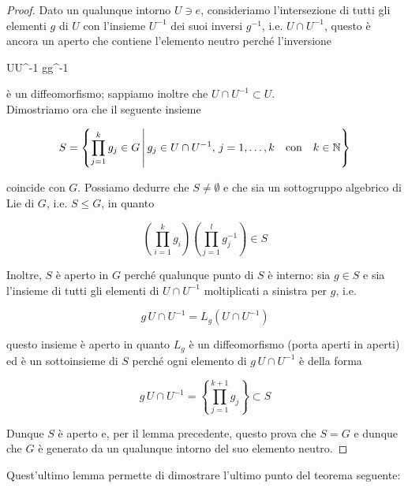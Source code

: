 \begin{proof}
	Dato un qualunque intorno $ U \ni e $, consideriamo l'intersezione di tutti gli elementi $ g $ di $ U $ con l'insieme $ U^{-1} $ dei suoi inversi $ g^{-1} $, i.e. $ U \cap U^{-1} $,  questo è ancora un aperto che contiene l'elemento neutro perché l'inversione
	
		{U}{U^{-1}}
		{g}{g^{-1}}
	
	è un diffeomorfismo; sappiamo inoltre che $ U \cap U^{-1} \subset U $.\\
	Dimostriamo ora che il seguente insieme
	
	\begin{equation}
		S = \left\{ \prod_{j=1}^{k} g_{j} \in G \st g_{j} \in U \cap U^{-1}, \, j=1,\dots,k \qq{con} k \in \N \right\}
	\end{equation}
	
	coincide con $ G $. Possiamo dedurre che $ S \neq \emptyset $ e che sia un sottogruppo algebrico di Lie di $ G $, i.e. $ S \leqslant G $, in quanto
	
	\begin{equation}
		\left( \prod_{i=1}^{k} g_{i} \right) \left( \prod_{j=1}^{l} g_{j}^{-1} \right) \in S
	\end{equation}
	
	Inoltre, $ S $ è aperto in $ G $ perché qualunque punto di $ S $ è interno: sia $ g \in S $ e sia l'insieme di tutti gli elementi di $ U \cap U^{-1} $ moltiplicati a sinistra per $ g $, i.e.
	
	\begin{equation}
		g \, U \cap U^{-1} = L_{g}(U \cap U^{-1})
	\end{equation}
	
	questo insieme è aperto in quanto $ L_{g} $ è un diffeomorfismo (porta aperti in aperti) ed è un sottoinsieme di $ S $ perché ogni elemento di $ g \, U \cap U^{-1} $ è della forma
	
	\begin{equation}
		g \, U \cap U^{-1} = \left\{ \prod_{j=1}^{k+1} g_{j} \right\} \subset S
	\end{equation}
	
	Dunque $ S $ è aperto e, per il lemma precedente, questo prova che $ S = G $ e dunque che $ G $ è generato da un qualunque intorno del suo elemento neutro.
\end{proof}

Quest'ultimo lemma permette di dimostrare l'ultimo punto del teorema seguente:


